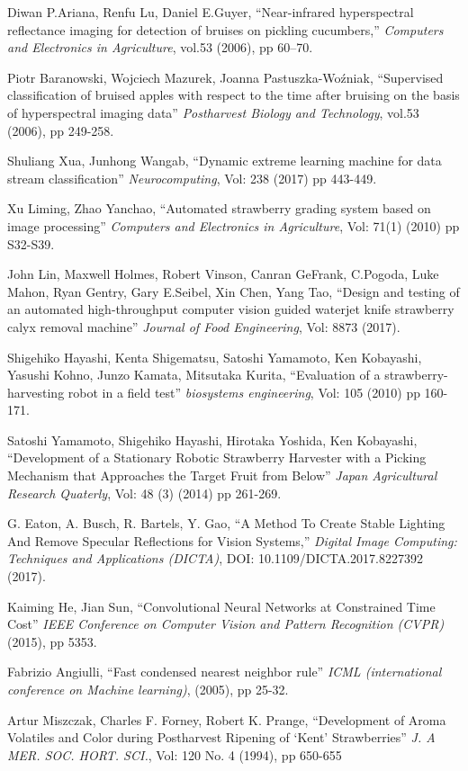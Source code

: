 \documentclass[conference]{IEEEtran}
\begin{document}
\begin{thebibliography}{1}
	Diwan P.Ariana, Renfu Lu, Daniel E.Guyer, ``Near-infrared hyperspectral reflectance imaging for detection of bruises on pickling cucumbers,'' {\em Computers and Electronics in Agriculture}, vol.53 (2006), pp 60–70.
	
	Piotr Baranowski, Wojciech Mazurek, Joanna Pastuszka-Woźniak, ``Supervised classification of bruised apples with respect to the time after bruising on the basis of hyperspectral imaging data'' {\em Postharvest Biology and Technology}, vol.53 (2006), pp 249-258.
	
	Shuliang Xua, Junhong Wangab, ``Dynamic extreme learning machine for data stream classification'' {\em Neurocomputing}, Vol: 238 (2017) pp 443-449.
	
	Xu Liming, Zhao Yanchao, ``Automated strawberry grading system based on image processing'' {\em Computers and Electronics in Agriculture}, Vol: 71(1) (2010) pp S32-S39.
	
	John Lin, Maxwell Holmes, Robert Vinson, Canran GeFrank, C.Pogoda, Luke Mahon, Ryan Gentry, Gary E.Seibel, Xin Chen, Yang Tao, ``Design and testing of an automated high-throughput computer vision guided waterjet knife strawberry calyx removal machine'' {\em Journal of Food Engineering}, Vol: 8873 (2017).
	
	Shigehiko Hayashi, Kenta Shigematsu, Satoshi Yamamoto, Ken Kobayashi, Yasushi Kohno, Junzo Kamata, Mitsutaka Kurita, ``Evaluation of a strawberry-harvesting robot in a field test'' {\em biosystems engineering}, Vol: 105 (2010) pp 160-171.
	
	Satoshi Yamamoto, Shigehiko Hayashi, Hirotaka Yoshida, Ken Kobayashi, ``Development of a Stationary Robotic Strawberry Harvester with a Picking Mechanism that Approaches the Target Fruit from Below'' {\em Japan Agricultural Research Quaterly}, Vol: 48 (3) (2014) pp 261-269.
	
	G. Eaton, A. Busch, R. Bartels, Y. Gao, ``A Method To Create Stable Lighting And Remove Specular Reflections for Vision Systems,'' {\em Digital Image Computing: Techniques and Applications (DICTA)}, DOI: 10.1109/DICTA.2017.8227392 (2017).
	
	Kaiming He, Jian Sun, ``Convolutional Neural Networks at Constrained Time Cost'' {\em IEEE Conference on Computer Vision and Pattern Recognition (CVPR)} (2015), pp 5353.
	
	Fabrizio Angiulli, ``Fast condensed nearest neighbor rule'' {\em ICML (international conference on Machine learning)}, (2005), pp 25-32.
	
	Artur Miszczak,  Charles F. Forney, Robert K. Prange, ``Development of Aroma Volatiles and Color during Postharvest Ripening of ‘Kent’ Strawberries'' {\em J. A	MER. SOC. HORT. SCI.}, Vol: 120 No. 4 (1994), pp 650-655
	
\end{thebibliography}





\end{document}
